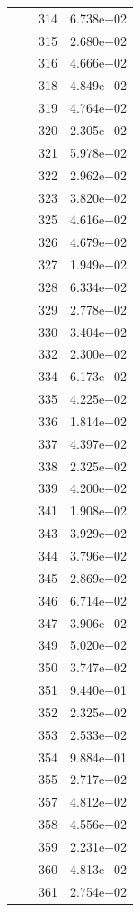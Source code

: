 \documentclass[12pt]{article}
\begin{document}
\begin{longtable}{@{}cccc@{}}
 &  & 314 & 6.738e+02 \\
 &  & 315 & 2.680e+02 \\
 &  & 316 & 4.666e+02 \\
 &  & 318 & 4.849e+02 \\
 &  & 319 & 4.764e+02 \\
 &  & 320 & 2.305e+02 \\
 &  & 321 & 5.978e+02 \\
 &  & 322 & 2.962e+02 \\
 &  & 323 & 3.820e+02 \\
 &  & 325 & 4.616e+02 \\
 &  & 326 & 4.679e+02 \\
 &  & 327 & 1.949e+02 \\
 &  & 328 & 6.334e+02 \\
 &  & 329 & 2.778e+02 \\
 &  & 330 & 3.404e+02 \\
 &  & 332 & 2.300e+02 \\
 &  & 334 & 6.173e+02 \\
 &  & 335 & 4.225e+02 \\
 &  & 336 & 1.814e+02 \\
 &  & 337 & 4.397e+02 \\
 &  & 338 & 2.325e+02 \\
 &  & 339 & 4.200e+02 \\
 &  & 341 & 1.908e+02 \\
 &  & 343 & 3.929e+02 \\
 &  & 344 & 3.796e+02 \\
 &  & 345 & 2.869e+02 \\
 &  & 346 & 6.714e+02 \\
 &  & 347 & 3.906e+02 \\
 &  & 349 & 5.020e+02 \\
 &  & 350 & 3.747e+02 \\
 &  & 351 & 9.440e+01 \\
 &  & 352 & 2.325e+02 \\
 &  & 353 & 2.533e+02 \\
 &  & 354 & 9.884e+01 \\
 &  & 355 & 2.717e+02 \\
 &  & 357 & 4.812e+02 \\
 &  & 358 & 4.556e+02 \\
 &  & 359 & 2.231e+02 \\
 &  & 360 & 4.813e+02 \\
 &  & 361 & 2.754e+02 \\

\end{longtable}
\end{document}
